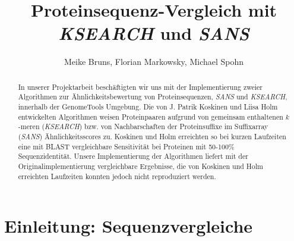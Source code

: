 \documentclass{article}
\title{Proteinsequenz-Vergleich mit \emph{KSEARCH} und \emph{SANS}}
\author{Meike Bruns, Florian Markowsky, Michael Spohn}
\begin{document}
\maketitle
\thispagestyle{empty}
\begin{abstract}
In unserer Projektarbeit beschäftigten wir uns mit der Implementierung zweier Algorithmen zur Ähnlichkeitsbewertung von Proteinsequenzen, \emph{SANS} und \emph{KSEARCH}, innerhalb der GenomeTools Umgebung. Die von J. Patrik Koskinen und Liisa Holm entwickelten Algorithmen weisen Proteinpaaren aufgrund von gemeinsam enthaltenen $k$-meren (\emph{KSEARCH}) bzw. von Nachbarschaften der Proteinsuffixe im Suffixarray (\emph{SANS}) Ähnlichkeitsscores zu. Koskinen und Holm erreichten so bei kurzen Laufzeiten eine mit BLAST vergleichbare Sensitivität bei Proteinen mit 50-100\% Sequenzidentität. Unsere Implementierung der Algorithmen liefert mit der Originalimplementierung vergleichbare Ergebnisse, die von Koskinen und Holm erreichten Laufzeiten konnten jedoch nicht reproduziert werden.
\end{abstract}
\newpage

\tableofcontents
\thispagestyle{empty}
\newpage

\section{Einleitung: Sequenzvergleiche}
\end{document}
